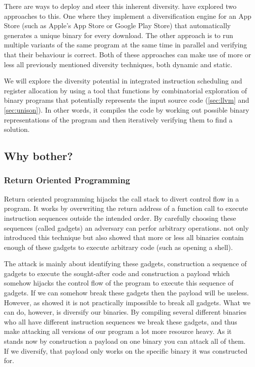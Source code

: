 There are ways to deploy and steer this inherent diversity. \textcite{compiler-generated-sw-div}
have explored two approaches to this. One where they implement a diversification engine for
an App Store (such as Apple's App Store or Google Play Store) that automatically generates
a unique binary for every download. The other approach is to run multiple variants of the
same program at the same time in parallel and verifying that their behaviour is correct.
Both of these approaches can make use of more or less all previously mentioned diversity
techniques, both dynamic and static.

We will explore the diversity potential in integrated instruction scheduling and register
allocation by using a tool that functions by combinatorial exploration of binary programs
that potentially represents the input source code (\ref{sec:llvm} and \ref{sec:unison}).
In other words, it compiles the code by working out possible binary representations of the
program and then iteratively verifying them to find a solution.

\subsection{Why bother?}
\subsubsection{Return Oriented Programming}
Return oriented programming hijacks the call stack to divert control flow in a program. It
works by overwriting the return address of a function call to execute instruction sequences
outside the intended order. By carefully choosing these sequences (called gadgets) an adversary
can perfor arbitrary operations. \textcite{rop} not only introduced this technique
but also showed that more or less all binaries contain enough of these gadgets to execute
arbitrary code (such as opening a shell).

The attack is mainly about identifying these gadgets, construction a sequence of
gadgets to execute the sought-after code and construction a payload which somehow hijacks
the control flow of the program to execute this sequence of gadgets. If we can somehow
break these gadgets then the payload will be useless. However, as \textcite{rop} showed
it is not practically impossible to break all gadgets. What we can do, however, is diversify
our binaries. By compiling several different binaries who all have different instruction
sequences we break these gadgets, and thus make attacking all versions of our program
a lot more resource heavy. As it stands now by construction a payload on one binary you can
attack all of them. If we diversify, that payload only works on the specific binary it was
constructed for.

